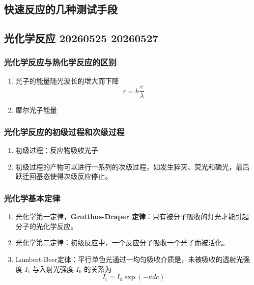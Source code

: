 \subsection{快速反应的几种测试手段}

\subsection{光化学反应 20260525 20260527}

\subsubsection{光化学反应与热化学反应的区别}

\begin{enumerate}
    \item 光子的能量随光波长的增大而下降
    \begin{equation*}
        \varepsilon = h \frac{c}{\lambda}
    \end{equation*}
    \item 摩尔光子能量
\end{enumerate}

\subsubsection{光化学反应的初级过程和次级过程}

\begin{enumerate}
    \item 初级过程：反应物吸收光子
    \item 初级过程的产物可以进行一系列的次级过程，如发生猝灭、荧光和磷光，最后跃迁回基态使得次级反应停止。
\end{enumerate}

\subsubsection{光化学基本定律}

\begin{enumerate}
    \item 光化学第一定律，\textbf{Grotthus-Draper 定律}：只有被分子吸收的灯光才能引起分子的光化学反应。
    \item 光化学第二定律：初级反应中，一个反应分子吸收一个光子而被活化。
    \item Lambert-Beer定律：平行单色光通过一均匀吸收介质是，未被吸收的透射光强度 $I_\mathrm{t}$ 与入射光强度 $I_0$ 的关系为
    \begin{equation}
        I_\mathrm{t} = I_0 \exp\left(-\kappa d c\right)
    \end{equation}
\end{enumerate}

